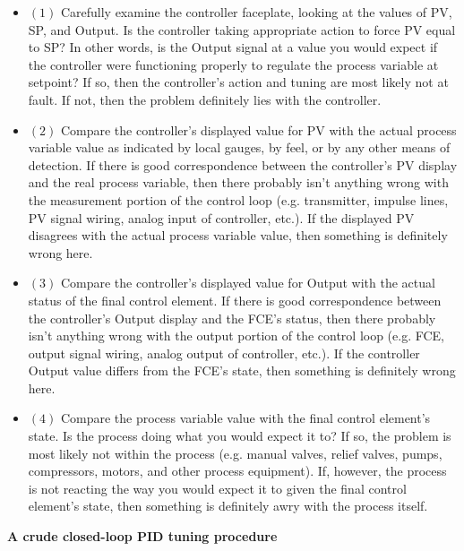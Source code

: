 \begin{itemize}
\item{$(1)$}  Carefully examine the controller faceplate, looking at the values of PV, SP, and Output.  Is the controller taking appropriate action to force PV equal to SP?  In other words, is the Output signal at a value you would expect if the controller were functioning properly to regulate the process variable at setpoint?  If so, then the controller's action and tuning are most likely not at fault.  If not, then the problem definitely lies with the controller.
\item{$(2)$}  Compare the controller's displayed value for PV with the actual process variable value as indicated by local gauges, by feel, or by any other means of detection.  If there is good correspondence between the controller's PV display and the real process variable, then there probably isn't anything wrong with the measurement portion of the control loop (e.g. transmitter, impulse lines, PV signal wiring, analog input of controller, etc.).  If the displayed PV disagrees with the actual process variable value, then something is definitely wrong here.
\item{$(3)$}  Compare the controller's displayed value for Output with the actual status of the final control element.  If there is good correspondence between the controller's Output display and the FCE's status, then there probably isn't anything wrong with the output portion of the control loop (e.g. FCE, output signal wiring, analog output of controller, etc.).  If the controller Output value differs from the FCE's state, then something is definitely wrong here.
\item{$(4)$}  Compare the process variable value with the final control element's state.  Is the process doing what you would expect it to?  If so, the problem is most likely not within the process (e.g. manual valves, relief valves, pumps, compressors, motors, and other process equipment).  If, however, the process is not reacting the way you would expect it to given the final control element's state, then something is definitely awry with the process itself.
\end{itemize}






\vfil \eject

\centerline{\bf A crude closed-loop PID tuning procedure}

